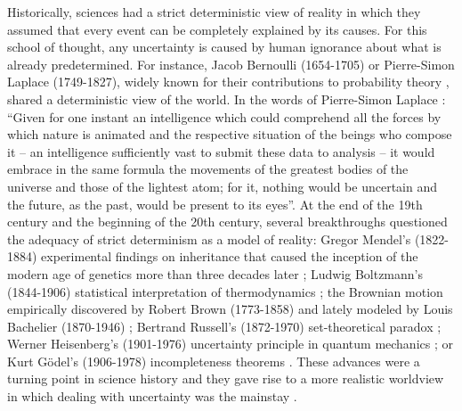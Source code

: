 
Historically, sciences had a strict deterministic view of reality in which they assumed that every event can be completely explained by its causes. For this school of thought, any uncertainty is caused by human ignorance about what is already predetermined. For instance, Jacob Bernoulli (1654-1705) or Pierre-Simon Laplace (1749-1827), widely known for their contributions to probability theory \cite{Bernoulli1713,Laplace1812}, shared a deterministic view of the world. In the words of Pierre-Simon Laplace \cite{Laplace1902}: ``Given for one instant an intelligence which could comprehend all the forces by which nature is animated and the respective situation of the beings who compose it – an intelligence sufficiently vast to submit these data to analysis – it would embrace in the same formula the movements of the greatest bodies of the universe and those of the lightest atom; for it, nothing would be uncertain and the future, as the past, would be present to its eyes''. At the end of the 19th century and the beginning of the 20th century, several breakthroughs questioned the adequacy of strict determinism as a model of reality: Gregor Mendel's (1822-1884) experimental findings on inheritance that caused the inception of the modern age of genetics more than three decades later \cite{Gayon2016}; Ludwig Boltzmann's (1844-1906) statistical interpretation of thermodynamics \cite{Swendsen2010}; the Brownian motion empirically discovered by Robert Brown (1773-1858) and lately modeled by Louis Bachelier (1870-1946) \cite{Seth2020}; Bertrand Russell's (1872-1970) set-theoretical paradox \cite{Godehard2004}; Werner Heisenberg's (1901-1976) uncertainty principle in quantum mechanics \cite{Cassidy1992}; or Kurt Gödel's (1906-1978) incompleteness theorems \cite{Raatikainen2022}. These advances were a turning point in science history and they gave rise to a more realistic worldview in which dealing with uncertainty was the mainstay \cite{Raper2020}.


